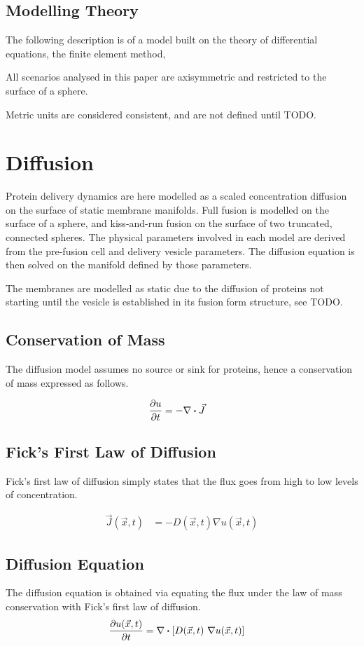 \documentclass{report}
\newcommand\Brack[1]{{ \left[{#1}\right] }}
\begin{document}
\section{Modelling Theory}
The following description is of a model built on the theory of differential equations, the finite element method, 

All scenarios analysed in this paper are axisymmetric and restricted to the surface of a sphere.

Metric units are considered consistent, and are not defined until TODO.

\chapter{Diffusion}
Protein delivery dynamics are here modelled as a scaled concentration diffusion on the surface of static membrane manifolds. Full fusion is modelled on the surface of a sphere, and kiss-and-run fusion on the surface of two truncated, connected spheres. The physical parameters involved in each model are derived from the pre-fusion cell and delivery vesicle parameters. The diffusion equation is then solved on the manifold defined by those parameters.

The membranes are modelled as static due to the diffusion of proteins not starting until the vesicle is established in its fusion form structure, see TODO.

\section{Conservation of Mass}
The diffusion model assumes no source or sink for proteins, hence a conservation of mass expressed as follows.

\begin{align*}
	\pdv{u}{t} &= -\nabla \dotproduct \vec{J}
\end{align*}

\section{Fick's First Law of Diffusion}
Fick's first law of diffusion simply states that the flux goes from high to low levels of concentration.

\begin{align*}
	\vec{J}(\vec{x}, t) &= -D(\vec{x}, t) \nabla{u(\vec{x}, t)}
\end{align*}

\section{Diffusion Equation}
The diffusion equation is obtained via equating the flux under the law of mass conservation with Fick's first law of diffusion.
\begin{align*}
	\pdv{u(\vec{x}, t)}{t} &= \nabla \dotproduct \Brack{D(\vec{x}, t)\ \nabla{u(\vec{x}, t)}}
\end{align*}
\end{document}
